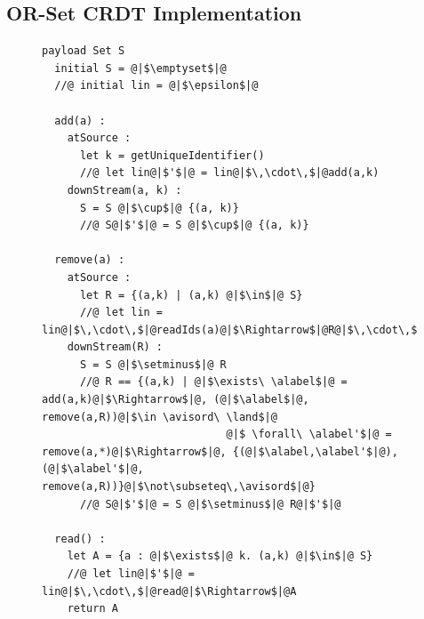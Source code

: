 

\subsection{OR-Set CRDT Implementation}
\label{sec:or-set-crdt}

\begin{figure}[!t]
  \centering
\begin{lstlisting}[caption={Pseudo-code of the OR-Set CRDT},
captionpos=b,label={lst:or-set}]
  payload Set S
  initial S = @|$\emptyset$|@
  //@ initial lin = @|$\epsilon$|@

  add(a) :
    atSource :
      let k = getUniqueIdentifier()
      //@ let lin@|$'$|@ = lin@|$\,\cdot\,$|@add(a,k)
    downStream(a, k) :
      S = S @|$\cup$|@ {(a, k)}
      //@ S@|$'$|@ = S @|$\cup$|@ {(a, k)}

  remove(a) :
    atSource :
      let R = {(a,k) | (a,k) @|$\in$|@ S}
      //@ let lin = lin@|$\,\cdot\,$|@readIds(a)@|$\Rightarrow$|@R@|$\,\cdot\,$|@remove(a,R)
    downStream(R) :
      S = S @|$\setminus$|@ R
      //@ R == {(a,k) | @|$\exists\ \alabel$|@ = add(a,k)@|$\Rightarrow$|@, (@|$\alabel$|@, remove(a,R))@|$\in \avisord\ \land$|@
                             @|$ \forall\ \alabel'$|@ = remove(a,*)@|$\Rightarrow$|@, {(@|$\alabel,\alabel'$|@),(@|$\alabel'$|@, remove(a,R))}@|$\not\subseteq\,\avisord$|@}
      //@ S@|$'$|@ = S @|$\setminus$|@ R@|$'$|@

  read() :
    let A = {a : @|$\exists$|@ k. (a,k) @|$\in$|@ S}
    //@ let lin@|$'$|@ = lin@|$\,\cdot\,$|@read@|$\Rightarrow$|@A
    return A
\end{lstlisting}
\end{figure}

